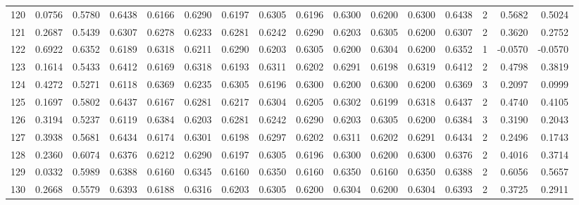 \begin{tabular}{lrrrrrrrrrrrrrrr}
120 &      0.0756 &  0.5780 &  0.6438 &  0.6166 &  0.6290 &  0.6197 &  0.6305 &  0.6196 &  0.6300 &  0.6200 &   0.6300 &     0.6438 &      2 &                    0.5682 &                     0.5024 \\
121 &      0.2687 &  0.5439 &  0.6307 &  0.6278 &  0.6233 &  0.6281 &  0.6242 &  0.6290 &  0.6203 &  0.6305 &   0.6200 &     0.6307 &      2 &                    0.3620 &                     0.2752 \\
122 &      0.6922 &  0.6352 &  0.6189 &  0.6318 &  0.6211 &  0.6290 &  0.6203 &  0.6305 &  0.6200 &  0.6304 &   0.6200 &     0.6352 &      1 &                   -0.0570 &                    -0.0570 \\
123 &      0.1614 &  0.5433 &  0.6412 &  0.6169 &  0.6318 &  0.6193 &  0.6311 &  0.6202 &  0.6291 &  0.6198 &   0.6319 &     0.6412 &      2 &                    0.4798 &                     0.3819 \\
124 &      0.4272 &  0.5271 &  0.6118 &  0.6369 &  0.6235 &  0.6305 &  0.6196 &  0.6300 &  0.6200 &  0.6300 &   0.6200 &     0.6369 &      3 &                    0.2097 &                     0.0999 \\
125 &      0.1697 &  0.5802 &  0.6437 &  0.6167 &  0.6281 &  0.6217 &  0.6304 &  0.6205 &  0.6302 &  0.6199 &   0.6318 &     0.6437 &      2 &                    0.4740 &                     0.4105 \\
126 &      0.3194 &  0.5237 &  0.6119 &  0.6384 &  0.6203 &  0.6281 &  0.6242 &  0.6290 &  0.6203 &  0.6305 &   0.6200 &     0.6384 &      3 &                    0.3190 &                     0.2043 \\
127 &      0.3938 &  0.5681 &  0.6434 &  0.6174 &  0.6301 &  0.6198 &  0.6297 &  0.6202 &  0.6311 &  0.6202 &   0.6291 &     0.6434 &      2 &                    0.2496 &                     0.1743 \\
128 &      0.2360 &  0.6074 &  0.6376 &  0.6212 &  0.6290 &  0.6197 &  0.6305 &  0.6196 &  0.6300 &  0.6200 &   0.6300 &     0.6376 &      2 &                    0.4016 &                     0.3714 \\
129 &      0.0332 &  0.5989 &  0.6388 &  0.6160 &  0.6345 &  0.6160 &  0.6350 &  0.6160 &  0.6350 &  0.6160 &   0.6350 &     0.6388 &      2 &                    0.6056 &                     0.5657 \\
130 &      0.2668 &  0.5579 &  0.6393 &  0.6188 &  0.6316 &  0.6203 &  0.6305 &  0.6200 &  0.6304 &  0.6200 &   0.6304 &     0.6393 &      2 &                    0.3725 &                     0.2911 \\

\end{tabular}
